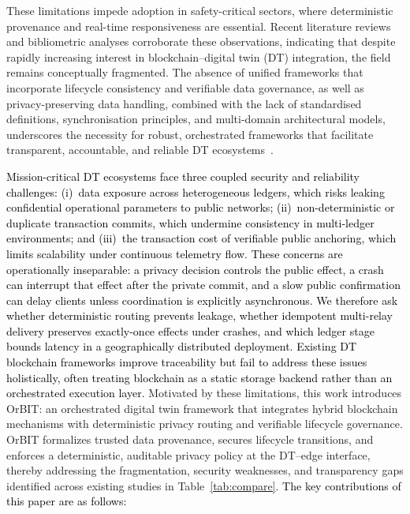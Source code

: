 \documentclass[final,5p,times,twocolumn]{elsarticle}
\begin{document}
These limitations impede adoption in safety-critical sectors, where deterministic provenance and real-time responsiveness are essential. Recent literature reviews and bibliometric analyses corroborate these observations, indicating that despite rapidly increasing interest in blockchain–digital twin (DT) integration, the field remains
conceptually fragmented. The absence of unified frameworks that incorporate lifecycle consistency and verifiable data
governance, as well as privacy-preserving data handling, combined with the lack of standardised definitions, synchronisation principles, and multi-domain architectural models, underscores the necessity for robust, orchestrated frameworks that facilitate transparent, accountable, and reliable DT ecosystems~\cite{ma2024examining}.
\smallskip
 
\noindent
\textcolor{black}{Mission-critical DT ecosystems face three coupled security and reliability challenges:
(i)~data exposure across heterogeneous ledgers, which risks leaking confidential
operational parameters to public networks;
(ii)~non-deterministic or duplicate transaction commits, which undermine consistency in
multi-ledger environments; and
(iii)~the transaction cost of verifiable public anchoring, which limits scalability under
continuous telemetry flow. These concerns are operationally inseparable: a privacy decision controls the public effect, a crash can interrupt that effect after the private commit, and a slow public confirmation can delay clients unless coordination is explicitly asynchronous. We therefore ask whether deterministic routing prevents leakage, whether idempotent multi-relay delivery preserves exactly-once effects under crashes, and which ledger stage bounds latency in a geographically distributed deployment.
Existing DT blockchain frameworks improve traceability but fail to address these issues
holistically, often treating blockchain as a static storage backend rather than an
orchestrated execution layer.}
Motivated by these limitations, this work introduces OrBIT: an orchestrated digital twin
framework that integrates hybrid blockchain mechanisms with deterministic privacy routing
and verifiable lifecycle governance. OrBIT formalizes trusted data provenance, secures
lifecycle transitions, and enforces a deterministic, auditable privacy policy at the
DT--edge interface, thereby addressing the fragmentation, security weaknesses, and
transparency gaps identified across existing studies in Table~\ref{tab:compare}.
\textcolor{black}{The key contributions of this paper are as follows:}
\end{document}
